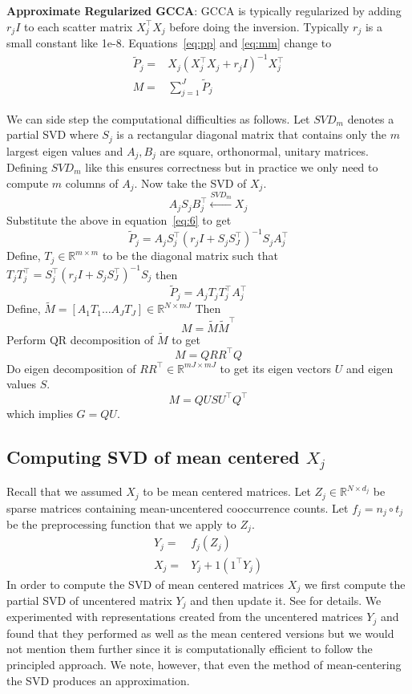 \documentclass[11pt]{article}
\begin{document}
\textbf{Approximate Regularized GCCA}: GCCA is typically regularized by adding $r_jI$ to each
scatter matrix $X_j^\top X_j$ before doing the inversion. Typically
$r_j$ is a small constant like 1e-8. Equations~\ref{eq:pp}
and \ref{eq:mm} change to
\begin{align}
  \widetilde{P}_{j} =& X_j(X_j^\top X_j+r_jI)^{-1}X_j^\top \label{eq:6}\\
  M =& \sum_{j=1}^J \widetilde{P}_{j} \label{eq:mmm}
\end{align}

We can side step the computational difficulties as follows.
Let $SVD_m$ denotes a partial SVD where $S_j$ is a rectangular diagonal
matrix that contains only the $m$ largest eigen values and $A_j, B_j$
are square, orthonormal, unitary matrices. Defining $SVD_m$ like this
ensures correctness but in practice we only need to compute $m$
columns of $A_j$. Now take the SVD of $X_j$.
$$A_{j} S_{j} B^\top_{j} \xleftarrow{SVD_{m}} X_j$$
 Substitute the above in equation~\ref{eq:6} to get 
$$\widetilde{P}_j = A_j S_j^\top(r_j I + S_j S_J^\top)^{-1}S_j A_j^\top$$ 
Define, $T_j \in \mathbb{R}^{m \times m}$ to be the diagonal matrix such that
$T_jT_j^\top = S_j^\top(r_j I + S_j S_J^\top)^{-1}S_j $ then
$$\widetilde{P}_j = A_j T_j T_j^\top A_j^\top$$
Define, $\tilde{M} = \left[ A_1T_1 \ldots A_JT_J \right] \in \mathbb{R}^{N
  \times mJ}$
Then 
$$M = \tilde{M} \tilde{M}^\top$$
Perform QR decomposition of $\tilde{M}$ to get
$$M = Q R R^\top Q$$
Do eigen decomposition of $R R^\top \in \mathbb{R}^{mJ \times mJ}$
to get its eigen vectors $U$ and eigen values $S$.
$$M = Q U S U^\top Q^\top$$
 which implies $G = QU$. 

\subsection{Computing SVD of mean centered $X_j$}
\label{ssec:svdmc}
Recall that we assumed $X_j$ to be mean centered matrices. Let $Z_j
\in \mathbb{R}^{N \times d_j}$ be sparse matrices containing
mean-uncentered cooccurrence counts. Let $f_j = n_j \circ t_j $ be the preprocessing
function that we apply to $Z_j$. 
\begin{align}
  Y_j =& f_j (Z_j) \\
  X_j =& Y_j + 1 (1^\top Y_j)
\end{align}
In order to compute the SVD of mean centered matrices $X_j$ we first
compute the partial SVD of uncentered 
matrix $Y_j$ and then update it. See \cite{brand2006fast} for details.
We experimented with representations created from the
uncentered matrices $Y_j$ and found that they performed as well as 
the mean centered versions but we would not mention them further since
it is computationally efficient to follow the principled approach. We
note, however, that even the method of mean-centering the SVD
produces an approximation.
\end{document}
